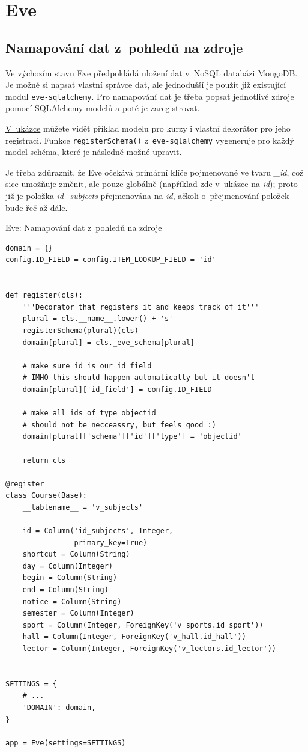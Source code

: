 \section{Eve}\label{eve}

\subsection{Namapování dat z~pohledů na zdroje}\label{namapovuxe1nuxed-dat-z-pohledux16f-na-zdroje}

Ve výchozím stavu Eve předpokládá uložení dat v~NoSQL databázi MongoDB. Je možné si napsat vlastní správce dat, ale jednodušší je použít již existující modul \verb!eve-sqlalchemy!. Pro namapování dat je třeba popsat jednotlivé zdroje pomocí SQLAlchemy modelů a poté je zaregistrovat.

\protect\hyperlink{code:eve:mapping}{V~ukázce} můžete vidět příklad modelu pro kurzy i vlastní dekorátor pro jeho registraci. Funkce \verb!registerSchema()! z~\verb!eve-sqlalchemy! vygeneruje pro každý model schéma, které je následně možné upravit.

Je třeba zdůraznit, že Eve očekává primární klíče pojmenované ve tvaru \emph{\_id}, což sice umožňuje změnit, ale pouze globálně (například zde v~ukázce na \emph{id}); proto již je položka \emph{id\_subjects} přejmenována na \emph{id}, ačkoli o~přejmenování položek bude řeč až dále.

\begin{listing}[htbp]
\caption{{\label{code:eve:mapping}Eve: Namapování dat z~pohledů na zdroje}}
\begin{verbatim}
domain = {}
config.ID_FIELD = config.ITEM_LOOKUP_FIELD = 'id'


def register(cls):
    '''Decorator that registers it and keeps track of it'''
    plural = cls.__name__.lower() + 's'
    registerSchema(plural)(cls)
    domain[plural] = cls._eve_schema[plural]

    # make sure id is our id_field
    # IMHO this should happen automatically but it doesn't
    domain[plural]['id_field'] = config.ID_FIELD

    # make all ids of type objectid
    # should not be necceassry, but feels good :)
    domain[plural]['schema']['id']['type'] = 'objectid'

    return cls

@register
class Course(Base):
    __tablename__ = 'v_subjects'

    id = Column('id_subjects', Integer,
                primary_key=True)
    shortcut = Column(String)
    day = Column(Integer)
    begin = Column(String)
    end = Column(String)
    notice = Column(String)
    semester = Column(Integer)
    sport = Column(Integer, ForeignKey('v_sports.id_sport'))
    hall = Column(Integer, ForeignKey('v_hall.id_hall'))
    lector = Column(Integer, ForeignKey('v_lectors.id_lector'))


SETTINGS = {
    # ...
    'DOMAIN': domain,
}

app = Eve(settings=SETTINGS)
\end{verbatim}
\end{listing}

